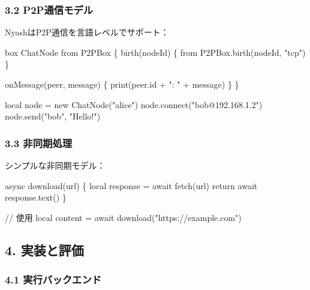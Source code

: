 \documentclass[
]{article}
\newenvironment{Shaded}{}{}
\newcommand{\NormalTok}[1]{#1}
\begin{document}
\hypertarget{p2pux901aux4fe1ux30e2ux30c7ux30eb}{%
\subsubsection{3.2
P2P通信モデル}\label{p2pux901aux4fe1ux30e2ux30c7ux30eb}}

NyashはP2P通信を言語レベルでサポート：

\begin{Shaded}
\begin{Highlighting}[]
\NormalTok{box ChatNode from P2PBox \{}
\NormalTok{    birth(nodeId) \{}
\NormalTok{        from P2PBox.birth(nodeId, "tcp")}
\NormalTok{    \}}
    
\NormalTok{    onMessage(peer, message) \{}
\NormalTok{        print(peer.id + ": " + message)}
\NormalTok{    \}}
\NormalTok{\}}

\NormalTok{local node = new ChatNode("alice")}
\NormalTok{node.connect("bob@192.168.1.2")}
\NormalTok{node.send("bob", "Hello!")}
\end{Highlighting}
\end{Shaded}

\hypertarget{ux975eux540cux671fux51e6ux7406}{%
\subsubsection{3.3 非同期処理}\label{ux975eux540cux671fux51e6ux7406}}

シンプルな非同期モデル：

\begin{Shaded}
\begin{Highlighting}[]
\NormalTok{async download(url) \{}
\NormalTok{    local response = await fetch(url)}
\NormalTok{    return await response.text()}
\NormalTok{\}}

\NormalTok{// 使用}
\NormalTok{local content = await download("https://example.com")}
\end{Highlighting}
\end{Shaded}

\hypertarget{ux5b9fux88c5ux3068ux8a55ux4fa1}{%
\subsection{4. 実装と評価}\label{ux5b9fux88c5ux3068ux8a55ux4fa1}}

\hypertarget{ux5b9fux884cux30d0ux30c3ux30afux30a8ux30f3ux30c9}{%
\subsubsection{4.1
実行バックエンド}\label{ux5b9fux884cux30d0ux30c3ux30afux30a8ux30f3ux30c9}}
\end{document}
